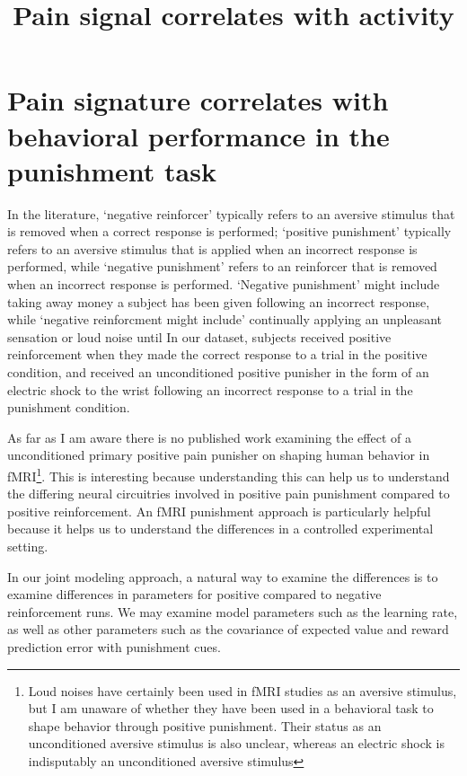 \documentclass[]{article}
\title{Pain signal correlates with activity}
\author{}
\date{}
\let\rmarkdownfootnote\footnote%
\def\footnote{\protect\rmarkdownfootnote}
\begin{document}
\maketitle

\section{Pain signature correlates with behavioral performance in the
punishment
task}\label{pain-signature-correlates-with-behavioral-performance-in-the-punishment-task}

In the literature, `negative reinforcer' typically refers to an aversive
stimulus that is removed when a correct response is performed; `positive
punishment' typically refers to an aversive stimulus that is applied
when an incorrect response is performed, while `negative punishment'
refers to an reinforcer that is removed when an incorrect response is
performed. `Negative punishment' might include taking away money a
subject has been given following an incorrect response, while `negative
reinforcment might include' continually applying an unpleasant sensation
or loud noise until In our dataset, subjects received positive
reinforcement when they made the correct response to a trial in the
positive condition, and received an unconditioned positive punisher in
the form of an electric shock to the wrist following an incorrect
response to a trial in the punishment condition.

As far as I am aware there is no published work examining the effect of
a unconditioned primary positive pain punisher on shaping human behavior
in
fMRI\footnote{Loud noises have certainly been used in fMRI studies as an aversive stimulus, but I am unaware of whether they have been used in a behavioral task to shape behavior through positive punishment. Their status as an unconditioned aversive stimulus is also unclear, whereas an electric shock is indisputably an unconditioned aversive stimulus}.
This is interesting because understanding this can help us to understand
the differing neural circuitries involved in positive pain punishment
compared to positive reinforcement. An fMRI punishment approach is
particularly helpful because it helps us to understand the differences
in a controlled experimental setting.

In our joint modeling approach, a natural way to examine the differences
is to examine differences in parameters for positive compared to
negative reinforcement runs. We may examine model parameters such as the
learning rate, as well as other parameters such as the covariance of
expected value and reward prediction error with punishment cues.
\end{document}
